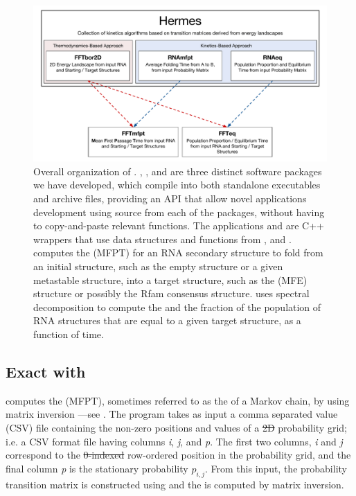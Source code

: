 \documentclass[11pt, oneside]{Thesis} %
\providecommand{\DIFadd}[1]{{\protect\color{blue}\uwave{#1}}} %
\providecommand{\DIFdel}[1]{{\protect\color{red}\sout{#1}}}                      %
\providecommand{\DIFaddbegin}{} %
\providecommand{\DIFaddend}{} %
\providecommand{\DIFdelbegin}{} %
\providecommand{\DIFdelend}{} %
\begin{document}
\begin{figure}[!ht]
\centering
\includegraphics[width=.9\textwidth]{Figures/Hermes/softwareOrg.pdf}
\caption[Overall organization of the \hermes software suite]{Overall
organization of
\hermes. \ffttwo, \rnamfpt, and \rnaeq are three distinct software
packages we have developed, which compile into both standalone
executables and archive files, providing an API that allow novel
applications development using source from each of the packages,
without having to copy-and-paste relevant functions. The applications
\fftmfpt and \ffteq are C++ wrappers that use data structures and functions from
\ffttwo, \rnamfpt and \rnaeq. \fftmfpt computes the
\mfpt (MFPT) for an RNA secondary structure to fold from an
initial structure, such as the empty structure or a given metastable
structure, into a target structure, such as the \mfe
(MFE) structure or possibly the Rfam \citep{Gardner.nar11} consensus
structure. \ffteq uses spectral decomposition to compute the \eqt and the
fraction of the population of RNA structures that are
equal to a given target structure, as a function of time.
}
\label{fig:hermes:organizationHermes}
\end{figure}

\subsection{Exact \mfpt with \rnamfpt}
\label{subsec:hermes:rnamfpt}

\rnamfpt computes the \mfpt (MFPT), sometimes
referred to as the \hit of a Markov chain, by using
matrix inversion \citep{meyermfpt}---see
. The program takes as input a
comma separated value (CSV) file containing the non-zero positions and
values of a \DIFdelbegin \DIFdel{2D }\DIFdelend \DIFaddbegin \twoD \DIFaddend probability grid; i.e. a CSV format file having columns {\em i},
{\em j}, and {\em p}. The first two columns, {\em i} and {\em j}
correspond to the \DIFdelbegin \DIFdel{0-indexed }\DIFdelend \DIFaddbegin \DIFadd{$0$-indexed }\DIFaddend row-ordered position in the probability grid, and
the final column {\em p} is the stationary probability $p_{i,j}$.
From this input, the probability transition matrix is constructed using
 and the
\mfpt is computed by matrix inversion.
\end{document}
